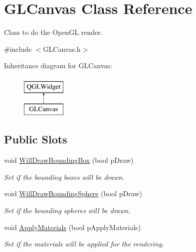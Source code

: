 \hypertarget{class_g_l_canvas}{\section{G\+L\+Canvas Class Reference}
\label{class_g_l_canvas}
}


Class to do the Open\+G\+L render.  




{\ttfamily \#include $<$G\+L\+Canvas.\+h$>$}

Inheritance diagram for G\+L\+Canvas\+:\begin{figure}[H]
\begin{center}
\leavevmode
\includegraphics[height=2.000000cm]{class_g_l_canvas}
\end{center}
\end{figure}
\subsection*{Public Slots}
\begin{DoxyCompactItemize}
\item 
void \hyperlink{class_g_l_canvas_a037f909d5c50fc0503a46a9493184f56}{Will\+Draw\+Bounding\+Box} (bool p\+Draw)
\begin{DoxyCompactList}\small\item\em Set if the bounding boxes will be drawn. \end{DoxyCompactList}\item 
void \hyperlink{class_g_l_canvas_a2d8d63019be91a9146e9e9251f6933b9}{Will\+Draw\+Bounding\+Sphere} (bool p\+Draw)
\begin{DoxyCompactList}\small\item\em Set if the bounding spheres will be drawn. \end{DoxyCompactList}\item 
void \hyperlink{class_g_l_canvas_a37bc7b32309c45bbe36cb6813c5ccd95}{Apply\+Materials} (bool p\+Apply\+Materials)
\begin{DoxyCompactList}\small\item\em Set if the materials will be applied for the rendering. \end{DoxyCompactList}\end{DoxyCompactItemize}
